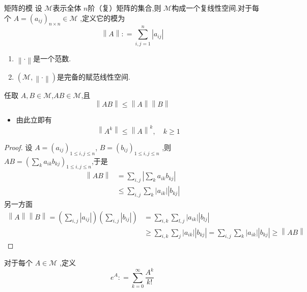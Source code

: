 \documentclass[lang=cn,12pt,color=green,fontset=none]{elegantbook}
\begin{document}
\begin{definition}{矩阵的模}
    设 $ \mathcal{M} $表示全体 $ n $阶（复）矩阵的集合,则 $ \mathcal{M} $构成一个复线性空间.对于每个 $ A=\left( a_{ij} \right)_{n\times n} \in \mathcal{M}  $  ,定义它的模为 $$
    \left\| A \right\| : = \sum _{i,j=1}^{n}\left| a_{ij} \right| 
    $$
\end{definition}
\begin{remark}
  \begin{enumerate}
    \item $ \left\| \cdot  \right\| $是一个范数.
    \item   $ \left( \mathcal{M}, \left\| \cdot  \right\| \right)  $是完备的赋范线性空间.  
  \end{enumerate}
  
\end{remark}

\begin{lemma}
    任取 $ A,B \in \mathcal{M} $,$ AB \in \mathcal{M} $,且 $$
    \left\| AB \right\| \le \left\| A \right\|\left\| B \right\|
    $$  
\end{lemma}

\begin{remark}
    \begin{itemize}
        \item 由此立即有 $$
        \left\| A^{k} \right\|\le \left\| A \right\|^{k},\quad k\ge 1
        $$
    \end{itemize}
    
\end{remark}
\begin{proof}
     设 $ A =\left( a_{ij} \right) _{1\le i,j\le n} $, $ B = \left( b_{ij} \right) _{1\le i,j\le n}$  ,则 $ AB = \left( \sum _{k}a_{ik}b_{kj} \right)_{1\le i,j\le n} $,于是 $$
     \begin{aligned}
     \left\| AB \right\|& = \sum _{i,j} \left| \sum _{k}a_{ik}b_{kj} \right|  \\ 
      & \le  \sum _{i,j} \sum _{k} \left| a_{ik} \right|\left| b_{kj} \right|  
     \end{aligned}
     $$另一方面 $$
    \begin{aligned}
        \left\| A \right\|\left\| B \right\| = \left( \sum _{i,j}\left| a_{ij} \right|  \right)\left( \sum _{i,j} \left| b_{ij} \right| \right)  &= \sum _{i,k}\sum _{l,j} \left| a_{ik} \right|\left| b_{lj} \right| \\ 
         & \ge \sum _{i,k}\sum _{j} \left| a_{ik} \right|\left| b_{kj} \right|  =\sum _{i,j}\sum _{k}\left| a_{ik} \right|\left| b_{kj} \right|  \ge  \left\| AB \right\| 
    \end{aligned}
     $$
\end{proof}
\begin{definition}
    对于每个 $ A \in \mathcal{M} $ ,定义 $$
    e^{A}: = \sum _{k=0}^{\infty} \frac{A^{k} }{k! } 
    $$
\end{definition}
\end{document}
